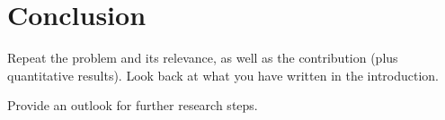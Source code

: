 \chapter{Conclusion}
\label{ch:Conclusion}

Repeat the problem and its relevance, as well as the contribution (plus quantitative results). 
Look back at what you have written in the introduction.

Provide an outlook for further research steps.